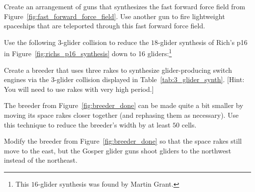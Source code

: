 \begin{multicols}{2}
\mfilbreak


\begin{problem}\label{exer:synthesize_ffff}
	Create an arrangement of guns that synthesizes the fast forward force field from Figure~\ref{fig:fast_forward_force_field}. Use another gun to fire lightweight spaceships that are teleported through this fast forward force field.
\end{problem}


\mfilbreak


\begin{problem}\label{exer:rich_p16_16}
	Use the following $3$-glider collision to reduce the $18$-glider synthesis of Rich's p16 in Figure~\ref{fig:richs_p16_synthesis} down to 16 gliders:\footnote{This $16$-glider synthesis was found by Martin Grant.}
	\begin{center}
	\end{center}
\end{problem}


\mfilbreak


\begin{problem}\label{exer:glider_producing_switch_breeder}
	Create a breeder that uses three rakes to synthesize glider-producing switch engines via the $3$-glider collision displayed in Table~\ref{tab:3_glider_synth}. [Hint: You will need to use rakes with very high period.]
\end{problem}


\mfilbreak



\begin{problem}\label{exer:breeder_minimize}
	The breeder from Figure~\ref{fig:breeder_done} can be made quite a bit smaller by moving its space rakes closer together (and rephasing them as necessary). Use this technique to reduce the breeder's width by at least $50$ cells.
\end{problem}


\mfilbreak


\begin{problem}\label{exer:breeder_done_northwest}
	Modify the breeder from Figure~\ref{fig:breeder_done} so that the space rakes still move to the east, but the Gosper glider guns shoot gliders to the northwest instead of the northeast.
\end{problem}


\mfilbreak



\end{multicols}
